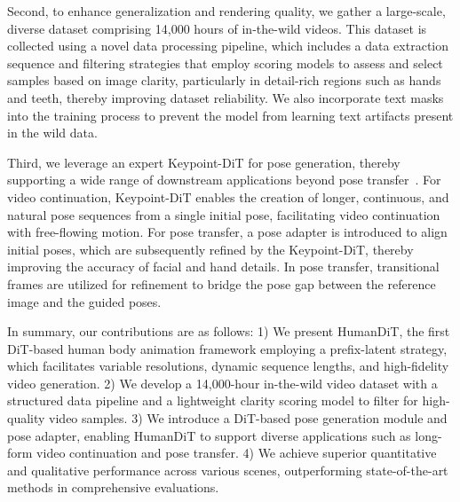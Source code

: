 Second, to enhance generalization and rendering quality, we gather a large-scale, diverse dataset comprising 14,000 hours of in-the-wild videos. This dataset is collected using a novel data processing pipeline, which includes a data extraction sequence and filtering strategies that employ scoring models to assess and select samples based on image clarity, particularly in detail-rich regions such as hands and teeth, thereby improving dataset reliability. We also incorporate text masks into the training process to prevent the model from learning text artifacts present in the wild data.

Third, we leverage an expert Keypoint-DiT for pose generation, thereby supporting a wide range of downstream applications beyond pose transfer~\cite{hu2024animate,zhang2024mimicmotion}. For video continuation, Keypoint-DiT enables the creation of longer, continuous, and natural pose sequences from a single initial pose, facilitating video continuation with free-flowing motion. 
For pose transfer, a pose adapter is introduced to align initial poses, which are subsequently refined by the Keypoint-DiT, thereby improving the accuracy of facial and hand details. In pose transfer, transitional frames are utilized for refinement to bridge the pose gap between the reference image and the guided poses.

In summary, our contributions are as follows: 1) We present HumanDiT, the first DiT-based human body animation framework employing a prefix-latent strategy, which facilitates variable resolutions, dynamic sequence lengths, and high-fidelity video generation. 2) We develop a 14,000-hour in-the-wild video dataset with a structured data pipeline and a lightweight clarity scoring model to filter for high-quality video samples. 3) We introduce a DiT-based pose generation module and pose adapter, enabling HumanDiT to support diverse applications such as long-form video continuation and pose transfer. 4) We achieve superior quantitative and qualitative performance across various scenes, outperforming state-of-the-art methods in comprehensive evaluations.

